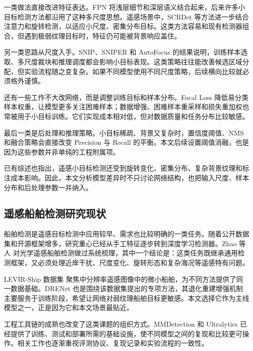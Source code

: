 一类做法直接改进特征表达。FPN\cite{lin2017_fpn} 将浅层细节和深层语义结合起来，后来许多小目标检测方法都沿用了这种多尺度思想。遥感场景中，SCRDet\cite{yang2019_scrdet} 等方法进一步结合注意力和旋转检测，以适应小尺度、密集分布目标。这类方法容易和现有检测器组合，但遇到极弱纹理目标时，特征仍可能被背景响应盖住。

另一类思路从尺度入手。SNIP\cite{singh2018_snip}、SNIPER\cite{singh2018_sniper} 和 AutoFocus\cite{najibi2019_autofocus} 的结果说明，训练样本选取、多尺度裁块和推理调度都会影响小目标表现。这类策略往往能改善候选区域分配，但实验流程随之变复杂。如果不同模型使用不同尺度策略，后续横向比较就必须格外谨慎。

还有一些工作不大改网络，而是调整训练目标和样本分布。Focal Loss\cite{lin2017_focalloss} 降低易分类样本权重，让模型更多关注困难样本；数据增强、困难样本重采样和损失重加权也常被用于小目标训练。它们实现成本相对低，但对数据质量和任务分布比较敏感。

最后一类是后处理和推理策略。小目标稀疏、背景又复杂时，置信度阈值、NMS 和融合策略会直接改变 Precision 与 Recall 的平衡。本文后续设置阈值消融，也是因为这些参数并非单纯的工程附属项。

已有综述\cite{wang2023_sod_review}也指出，遥感小目标检测还受到旋转变化、密集分布、复杂背景纹理和标注成本影响。因此，本文分析模型差异时不只讨论网络结构，也把输入尺度、样本分布和后处理参数一并纳入。

\subsection{遥感船舶检测研究现状}

船舶检测是遥感目标检测中应用较早、需求也比较明确的一类任务。随着公开数据集和开源框架增多，研究重心已经从手工特征逐步转到深度学习检测器。Zhao 等人\cite{zhao2024_shipsurvey} 对光学遥感船舶检测做过系统梳理，其中一个结论是：这类任务既继承通用检测框架，又必须处理近岸干扰、尺度变化、旋转形态和复杂海况等遥感特有问题。

LEVIR-Ship 数据集\cite{chen2022_tinyship_drenet} 聚焦中分辨率遥感图像中的微小船舶，为不同方法提供了同一数据基础。DRENet 也是围绕该数据集提出的专项方法，其退化重建增强机制主要服务于训练阶段，希望让网络对弱纹理船舶目标更敏感。本文选择它作为主线模型之一，正是因为它和本文场景最贴近。

工程工具链的成熟也改变了这类课题的组织方式。MMDetection\cite{mmdet2018_openmmlab} 和 Ultralytics\cite{ultralytics2024_docs} 已经提供了训练、测试和部署所需的基础设施，使不同模型之间的复现和比较更可操作。相关工作也逐渐重视评测协议、复现记录和实验流程的一致性。

